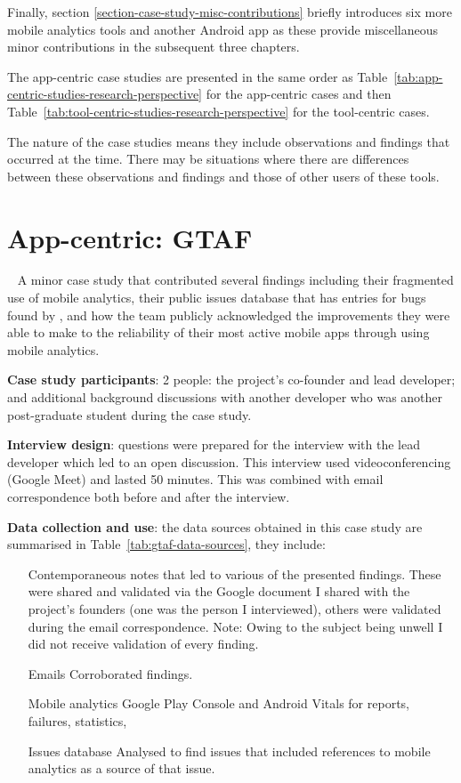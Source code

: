 Finally, section \ref{section-case-study-misc-contributions} briefly introduces six more mobile analytics tools and another Android app as these provide miscellaneous minor contributions in the subsequent three chapters.
    
The app-centric case studies are presented in the same order as Table~\ref{tab:app-centric-studies-research-perspective} for the app-centric cases and then Table~\ref{tab:tool-centric-studies-research-perspective} for the tool-centric cases. 

The nature of the case studies means they include observations and findings that occurred at the time. There may be situations where there are differences between these observations and findings and those of other users of these tools. 
\clearpage




\section{App-centric: GTAF}~\label{case-study-overview-gtaf}
A minor case study that contributed several findings including their fragmented use of mobile analytics, their public issues database that has entries for bugs found by , and how the team publicly acknowledged the improvements they were able to make to the reliability of their most active mobile apps through using mobile analytics.  

\textbf{Case study participants}: 2 people: the project's co-founder and lead developer; and additional background discussions with another developer who was another post-graduate student during the case study. 


\textbf{Interview design}: questions were prepared for the interview with the lead developer which led to an open discussion. This interview used videoconferencing (Google Meet) and lasted 50 minutes. This was combined with email correspondence both before and after the interview.

\textbf{Data collection and use}: the data sources obtained in this case study are summarised in Table~\ref{tab:gtaf-data-sources}, they include:  

\begin{itemize}
    \item[Contemporaneous notes] that led to various of the presented findings. These were shared and validated via the Google document I shared with the project's founders (one was the person I interviewed), others were validated during the email correspondence. Note: Owing to the subject being unwell I did not receive validation of every finding. 
    \item[Emails] Corroborated findings.
    \item[Mobile analytics] Google Play Console and Android Vitals for reports, failures, statistics,
    \item[Issues database] Analysed to find issues that included references to mobile analytics as a source of that issue.
\end{itemize}


